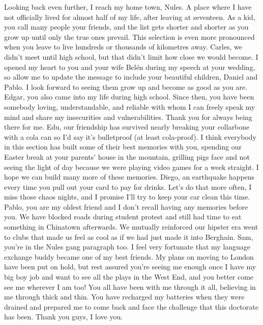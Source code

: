 Looking back even further, I reach my home town, Nules. A place where I have not officially lived for almost half of my life, after leaving at seventeen. As a kid, you call many people your friends, and the list gets shorter and shorter as you grow up until only the true ones prevail. This selection is even more pronounced when you leave to live hundreds or thousands of kilometres away. Carles, we didn't meet until high school, but that didn't limit how close we would become. I opened my heart to you and your wife Belén during my speech at your wedding, so allow me to update the message to include your beautiful children, Daniel and Pablo. I look forward to seeing them grow up and become as good as you are. Edgar, you also came into my life during high school. Since then, you have been somebody loving, understandable, and reliable with whom I can freely speak my mind and share my insecurities and vulnerabilities. Thank you for always being there for me. Edu, our friendship has survived nearly breaking your collarbone with a cola can so I'd say it's bulletproof (at least cola-proof). I think everybody in this section has built some of their best memories with you, spending our Easter break at your parents' house in the mountain, grilling pigs face and not seeing the light of day because we were playing video games for a week straight. I hope we can build many more of these memories. Diego, an earthquake happens every time you pull out your card to pay for drinks. Let's do that more often, I miss those chaos nights, and I promise I'll try to keep your car clean this time. Pablo, you are my oldest friend and I don't recall having any memories before you. We have blocked roads during student protest and still had time to eat something in Chinatown afterwards. We mutually reinforced our hipster era went to clubs that made us feel as cool as if we had just made it into Berghain. Sam, you're in the Nules gang paragraph too. I feel very fortunate that my language exchange buddy became one of my best friends. My plans on moving to London have been put on hold, but rest assured you're seeing me enough once I have my big boy job and want to see all the plays in the West End, and you better come see me wherever I am too! You all have been with me through it all, believing in me through thick and thin. You have recharged my batteries when they were drained and prepared me to come back and face the challenge that this doctorate has been. Thank you guys, I love you. 

